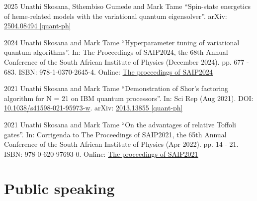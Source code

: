 \documentclass[10pt]{extreport}
\begin{document}
\begin{tablist}
	\item[2025] \tab{}Unathi Skosana, Sthembiso Gumede and Mark Tame \enquote{Spin-state energetics of heme-related models with the variational quantum eigensolver}. arXiv: \href{https://arxiv.org/abs/2504.08494}{2504.08494 [quant-ph]}
	\item[2024] \tab{}Unathi Skosana and Mark Tame \enquote{Hyperparameter tuning of variational quantum algorithms}. In: {The Proceedings of SAIP2024, the 68th  Annual Conference of
		the South African Institute of Physics} (December 2024). pp. 677 - 683. ISBN: 978-1-0370-2645-4. Online: \href{https://events.saip.org.za/event/246/page/666-the-proceedings-of-saip2024}{The proceedings of SAIP2024}
	\item[2021] \tab{}Unathi Skosana and Mark Tame \enquote{Demonstration of Shor’s factoring algorithm for N = 21 on IBM quantum processors}. In: {Sci Rep} (Aug 2021). DOI: \href{https://doi.org/10.1038/s41598-021-95973-w}{10.1038/s41598-021-95973-w}. arXiv: \href{https://arxiv.org/abs/2103.13855}{2013.13855 [quant-ph]}
	\item[2021] \tab{}Unathi Skosana and Mark Tame \enquote{On the advantages of relative
		Toffoli gates}. In: {Corrigenda to The Proceedings of SAIP2021, the 65th  Annual Conference of
		the South African Institute of Physics} (Apr 2022). pp. 14 - 21. ISBN:
		978-0-620-97693-0. Online: \href{https://events.saip.org.za/event/206/page/446-the-proceedings-of-saip2021}{The proceedings of SAIP2021}


\end{tablist}

\newpage{}

\section*{Public speaking}
\end{document}
